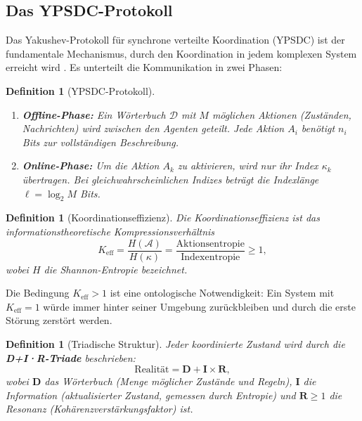 \documentclass[12pt,a4paper]{article}
\newtheorem{definition}[theorem]{Definition}
\theoremstyle{remark}
\newcommand{\Keff}{K_{\mathrm{eff}}}
\begin{document}
	\subsection{Das YPSDC-Protokoll}
	
	Das Yakushev-Protokoll für synchrone verteilte Koordination (YPSDC) ist der
	fundamentale Mechanismus, durch den Koordination in jedem komplexen System
	erreicht wird \cite{Yakushev2026a, AppendixB}.  Es unterteilt die Kommunikation
	in zwei Phasen:
	
	\begin{definition}[YPSDC-Protokoll]
		\begin{enumerate}[label=(\roman*)]
			\item \textbf{Offline-Phase:} Ein Wörterbuch \(\mathcal{D}\) mit
			\(M\) möglichen Aktionen (Zuständen, Nachrichten) wird zwischen den Agenten
			geteilt. Jede Aktion \(A_i\) benötigt \(n_i\) Bits zur vollständigen
			Beschreibung.
			\item \textbf{Online-Phase:} Um die Aktion \(A_k\) zu aktivieren, wird nur
			ihr Index \(\kappa_k\) übertragen. Bei gleichwahrscheinlichen Indizes beträgt
			die Indexlänge \(\ell = \log_2 M\) Bits.
		\end{enumerate}
	\end{definition}
	
	\begin{definition}[Koordinationseffizienz]
		Die Koordinationseffizienz ist das informationstheoretische Kompressionsverhältnis
		\begin{equation}
			\Keff = \frac{H(\mathcal{A})}{H(\kappa)} = \frac{\text{Aktionsentropie}}{\text{Indexentropie}} \ge 1,
			\label{eq:keff}
		\end{equation}
		wobei \(H\) die Shannon-Entropie bezeichnet.
	\end{definition}
	
	Die Bedingung \(K_{\mathrm{eff}} > 1\) ist eine ontologische Notwendigkeit: Ein System mit
	\(K_{\mathrm{eff}} = 1\) würde immer hinter seiner Umgebung zurückbleiben und durch
	die erste Störung zerstört werden.
	
	\begin{definition}[Triadische Struktur]
		Jeder koordinierte Zustand wird durch die \textbf{D+I·R-Triade} beschrieben:
		\[
		\text{Realität} = \mathbf{D} + \mathbf{I} \times \mathbf{R},
		\]
		wobei \(\mathbf{D}\) das Wörterbuch (Menge möglicher Zustände und Regeln),
		\(\mathbf{I}\) die Information (aktualisierter Zustand, gemessen durch Entropie)
		und \(\mathbf{R} \ge 1\) die Resonanz (Kohärenzverstärkungsfaktor) ist.
	\end{definition}
	
\end{document}
